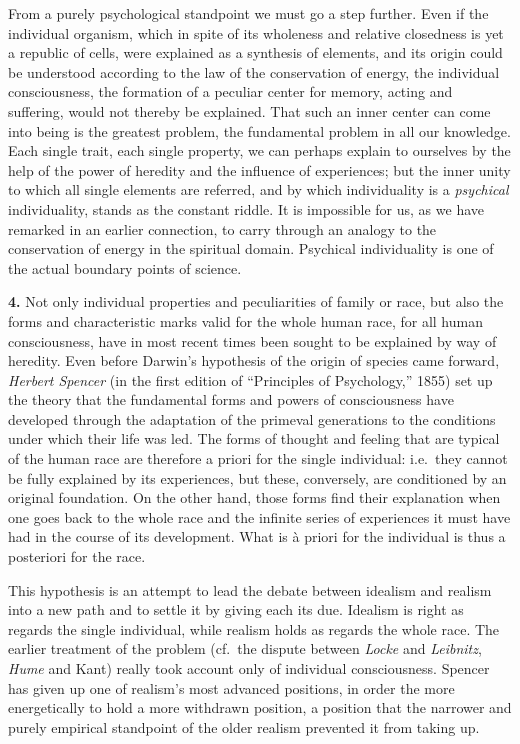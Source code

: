 \documentclass[12pt,a4paper]{book}
\newcommand{\opage}[1]{\marginnote{\footnotesize\textit{[#1]}}}
\begin{document}
From a purely psychological standpoint we must go a step further. Even if
the individual organism, which in spite of its wholeness and relative
closedness is yet a republic of cells, were explained as a synthesis of
elements, and its origin could be understood according to the law of the
conservation of energy, the individual consciousness, the formation of a
peculiar center for memory, acting and suffering, would not thereby be
explained. That such an inner center can come into being is the greatest
problem, the fundamental problem in all our knowledge. Each single trait,
each single property, we can perhaps explain to ourselves by the help of
the power of heredity and the influence of experiences; but the inner
unity to which all single elements are referred, and by which
individuality is a \emph{psychical} individuality, stands as the constant
riddle. It is impossible for us, as we have remarked in an earlier
connection, to carry through an analogy to the conservation of energy in
the spiritual domain. Psychical individuality is one of the actual
boundary points of science.

\textbf{4.} Not only individual properties and peculiarities of family or
race, but also the forms and characteristic marks valid for the whole
human race, for all human consciousness, have in most recent times been
sought to be explained by way of heredity. Even before Darwin's hypothesis
of the origin of species came forward, \emph{Herbert Spencer} (in the
first edition of ``Principles of Psychology,'' 1855) set up the theory
that the fundamental forms and powers of consciousness have developed
through the adaptation of the primeval generations to the conditions under
which their life was led. The forms of thought and feeling that are
typical of the human race are therefore a priori for the single
individual: i.e.\ they cannot be fully explained
\opage{411}by its experiences, but these, conversely, are conditioned by an
original foundation. On the other hand, those forms find their explanation
when one goes back to the whole race and the infinite series of
experiences it must have had in the course of its development. What is à
priori for the individual is thus a posteriori for the race.

This hypothesis is an attempt to lead the debate between idealism and
realism into a new path and to settle it by giving each its due. Idealism
is right as regards the single individual, while realism holds as regards
the whole race. The earlier treatment of the problem (cf.\ the dispute
between \emph{Locke} and \emph{Leibnitz}, \emph{Hume} and Kant) really
took account only of individual consciousness. Spencer has given up one
of realism's most advanced positions, in order the more energetically to
hold a more withdrawn position, a position that the narrower and purely
empirical standpoint of the older realism prevented it from taking up.
\end{document}

